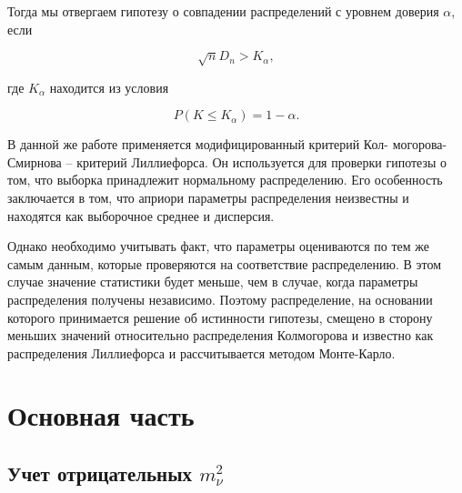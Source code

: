 ﻿\documentclass[a4paper,14pt]{extarticle}
\begin{document}
    Тогда мы отвергаем гипотезу о совпадении распределений с уровнем доверия $\alpha$, если
    
    \begin{equation}
      \sqrt{n}D_n > K_{\alpha},
    \end{equation}
    
    \noindent где $K_{\alpha}$ находится из условия

    \begin{equation}
      P(K \leq K_{\alpha}) = 1 - \alpha.
    \end{equation}
    
    В данной же работе применяется модифицированный критерий Кол- могорова-Смирнова -- 
    критерий Лиллиефорса\cite{lilliefors}. Он используется для проверки гипотезы о том, что
    выборка принадлежит нормальному распределению. Его особенность заключается в том, что
    априори параметры распределения неизвестны и находятся как выборочное среднее и дисперсия.
    
    Однако необходимо учитывать факт, что параметры оцениваются по тем же самым данным, которые
    проверяются на соответствие распределению. В этом случае значение статистики будет меньше,
    чем в случае, когда параметры распределения получены независимо. Поэтому распределение, 
    на основании которого принимается решение об истинности гипотезы, смещено в сторону меньших
    значений относительно распределения Колмогорова и известно как распределения Лиллиефорса и
    рассчитывается методом Монте-Карло.
    
    

    
    \newpage
    \section{Основная часть}
    
    \subsection{Учет отрицательных $m_{\nu}^2$}
    
\end{document}
